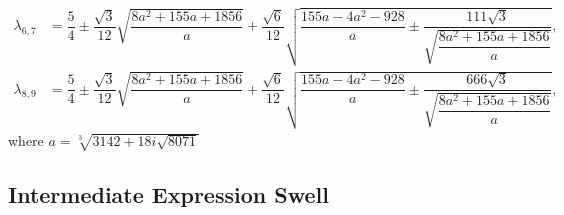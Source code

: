 \begin{example}
\begin{equation*}
    \begin{aligned}
      \lambda_{6,7} &= \dfrac{5}{4} \pm \dfrac{\sqrt{3}}{12}\sqrt{{\dfrac{8a^{2}+155a+1856}{a}}} + \dfrac{\sqrt{6}}{12}\sqrt{{\dfrac{155a-4a^{2}-928}{a}} \pm {\dfrac{111\sqrt{3}}{\sqrt{{\dfrac{8a^{2}+155a+1856}{a}}}}}}, \\[0.2em]
      \lambda_{8,9} &= \dfrac{5}{4} \pm \dfrac{\sqrt{3}}{12}\sqrt{{\dfrac{8a^{2}+155a+1856}{a}}} + \dfrac{\sqrt{6}}{12}\sqrt{{\dfrac{155a-4a^{2}-928}{a}} \pm {\dfrac{666\sqrt{3}}{\sqrt{{\dfrac{8a^{2}+155a+1856}{a}}}}}},
    \end{aligned}
  \end{equation*}
  where $a = \sqrt[3]{3142+18i\sqrt{8071}}$
\end{example}

\subsection{Intermediate Expression Swell}

